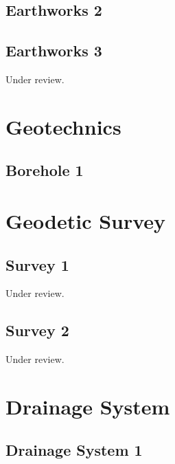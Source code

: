 \documentclass{scrartcl}
\begin{document}
\subsection{Earthworks 2}
\label{sec:earth_2}
\clearpage

\subsection{Earthworks 3}
\label{sec:earth_3}
Under review.%
\clearpage

\section{Geotechnics}

\subsection{Borehole 1}
\label{sec:borehole_1}
\clearpage

\section{Geodetic Survey}

\subsection{Survey 1}
\label{sec:survey_1}
Under review.%
\clearpage

\subsection{Survey 2}
\label{sec:survey_2}
Under review.%
\clearpage


\section{Drainage System}

\subsection{Drainage System 1}
\label{sec:drainage_1}
\clearpage
\end{document}
